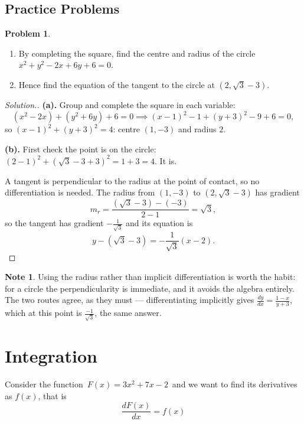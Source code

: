 \documentclass[11pt,a4paper]{article}
\theoremstyle{definition}
\newtheorem{note}[thm]{Note}
\newtheorem{problemx}{Problem}[section]
\newenvironment{problem}{\begin{problemx}}{\end{problemx}}
\newenvironment{solution}
  {\renewcommand{\qedsymbol}{}\begin{proof}[\textit{Solution}.]}
  {\end{proof}}
\begin{document}
\pagebreak

\subsection{Practice Problems}

\begin{problem}
\begin{enumerate}
\item[(a).] By completing the square, find the centre and radius of the circle
$x^{2}+y^{2}-2x+6y+6=0$.
\item[(b).] Hence find the equation of the tangent to the circle at
$\left(2,\sqrt{3}-3\right)$.
\end{enumerate}
\end{problem}

\begin{solution}
\textbf{(a).} Group and complete the square in each variable:
$$\left(x^{2}-2x\right)+\left(y^{2}+6y\right)+6=0
\implies (x-1)^{2}-1+(y+3)^{2}-9+6=0,$$
so $(x-1)^{2}+(y+3)^{2}=4$: centre $(1,-3)$ and radius $2$.

\textbf{(b).} First check the point is on the circle:
$(2-1)^{2}+\left(\sqrt{3}-3+3\right)^{2}=1+3=4$. It is.

A tangent is perpendicular to the radius at the point of contact, so no
differentiation is needed. The radius from $(1,-3)$ to $\left(2,\sqrt{3}-3\right)$
has gradient
$$m_{r}=\frac{\left(\sqrt{3}-3\right)-(-3)}{2-1}=\sqrt{3},$$
so the tangent has gradient $-\frac{1}{\sqrt{3}}$ and its equation is
$$y-\left(\sqrt{3}-3\right)=-\frac{1}{\sqrt{3}}(x-2).$$
\end{solution}

\begin{note}
Using the radius rather than implicit differentiation is worth the habit: for a
circle the perpendicularity is immediate, and it avoids the algebra entirely. The
two routes agree, as they must --- differentiating implicitly gives
$\frac{dy}{dx}=\frac{1-x}{y+3}$, which at this point is
$\frac{-1}{\sqrt{3}}$, the same answer.
\end{note}

\pagebreak
\section{Integration}

Consider the function $\, F(x) = 3x^2 + 7x - 2\,$ and we want to find its derivatives as $f(x)$, that is $$\frac{d F(x)}{dx} = f(x)$$
\end{document}
